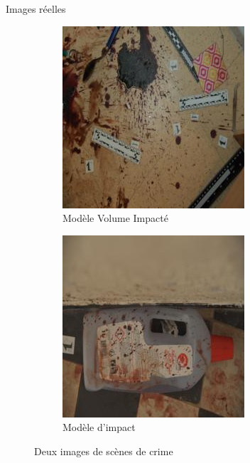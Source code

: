 \documentclass[11pt]{beamer}
\begin{document}
\begin{frame}{Images réelles}
    \begin{figure}[ht]
        \centering
        \begin{subfigure}{0.40\textwidth}
            \centering
            \includegraphics[width=\linewidth]{../asset/data_real/12.jpg}
            \caption{Modèle Volume Impacté}
        \end{subfigure}
        \begin{subfigure}{0.40\linewidth}
            \centering
            \includegraphics[width=\textwidth]{../asset/data_real/15.jpg}
            \caption{Modèle d'impact}
        \end{subfigure}
        \caption{Deux images de scènes de crime}
        \label{fig: reals images}
    \end{figure}
\end{frame}
\end{document}
